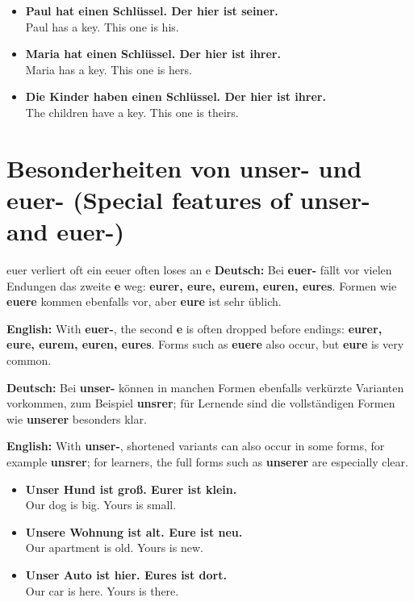 \documentclass[a4paper,11pt]{article}
\newcommand{\GermanText}[1]{\textbf{Deutsch: }#1\par}
\newcommand{\EnglishText}[1]{{\small\color{SoftGray}\textbf{English: }#1\par}}
\newcommand{\ExampleItem}[2]{\item \textbf{#1}\\{\small\color{SoftGray}#2}}
\begin{document}
        \begin{exbox}
            \begin{itemize}
                \ExampleItem{Paul hat einen Schlüssel. Der hier ist seiner.}{Paul has a key. This one is his.}
                \ExampleItem{Maria hat einen Schlüssel. Der hier ist ihrer.}{Maria has a key. This one is hers.}
                \ExampleItem{Die Kinder haben einen Schlüssel. Der hier ist ihrer.}{The children have a key. This one is theirs.}
            \end{itemize}
        \end{exbox}

    \section{Besonderheiten von unser- und euer- \textnormal{(Special features of unser- and euer-)}}

        \begin{grammarentry}{euer verliert oft ein e}{euer often loses an e}
            \GermanText{Bei \textbf{euer-} fällt vor vielen Endungen das zweite \textbf{e} weg: \textbf{eurer, eure, eurem, euren, eures}. Formen wie \textbf{euere} kommen ebenfalls vor, aber \textbf{eure} ist sehr üblich.}
            \EnglishText{With \textbf{euer-}, the second \textbf{e} is often dropped before endings: \textbf{eurer, eure, eurem, euren, eures}. Forms such as \textbf{euere} also occur, but \textbf{eure} is very common.}

            \GermanText{Bei \textbf{unser-} können in manchen Formen ebenfalls verkürzte Varianten vorkommen, zum Beispiel \textbf{unsrer}; für Lernende sind die vollständigen Formen wie \textbf{unserer} besonders klar.}
            \EnglishText{With \textbf{unser-}, shortened variants can also occur in some forms, for example \textbf{unsrer}; for learners, the full forms such as \textbf{unserer} are especially clear.}
        \end{grammarentry}

        \begin{exbox}
            \begin{itemize}
                \ExampleItem{Unser Hund ist groß. Eurer ist klein.}{Our dog is big. Yours is small.}
                \ExampleItem{Unsere Wohnung ist alt. Eure ist neu.}{Our apartment is old. Yours is new.}
                \ExampleItem{Unser Auto ist hier. Eures ist dort.}{Our car is here. Yours is there.}
            \end{itemize}
        \end{exbox}
\end{document}
